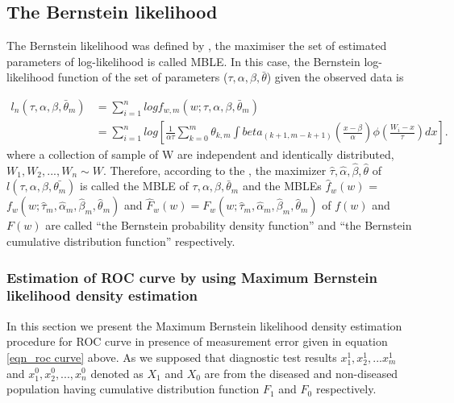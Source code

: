 \subsection{The Bernstein likelihood }


The Bernstein likelihood was defined by \cite{guan2016efficient}, the maximiser the set of estimated parameters of log-likelihood is called MBLE. In this case, the Bernstein log-likelihood function of the set of parameters ($\tau, \alpha, \beta, \bar{\theta}$) given the observed data is

\begin{equation}
\begin{split}
l_n(\tau, \alpha, \beta,\bar{\theta}_m) &=\sum_{i=1}^{n} log  f_{w,m}(w; \tau, \alpha, \beta, \bar \theta_m)\\
&=\sum_{i=1}^{n} log \displaystyle \left[\frac{1}{\alpha\tau} \displaystyle \sum_{k=0}^m \theta_{k,m} \int beta _{(k+1, m-k+1)}\left(\frac{x-\beta}{\alpha}\right)\phi \displaystyle\left(\frac{W_i-x}{\tau}\right) dx \right].
\end{split}
\end{equation}
where  a collection of sample of W are  independent and identically distributed, $W_1, W_2, ..., W_n \sim W $. Therefore, according to the \cite{guan2016efficient}, the maximizer $\hat{\tau},\hat{\alpha}, \hat{\beta}, \hat{\theta}$ of $l(\tau, \alpha, \beta,\bar{\theta_m})$ is called the MBLE of $ \tau,\alpha, \beta,\bar{\theta}_m$ and the MBLEs $\hat{f}_w(w)$ = $f_w(w; \hat{\tau}_m,\hat{\alpha}_m, \hat{\beta}_m, \hat{\theta}_m)$  and $\hat{F}_w(w) = F_w(w; \hat{\tau}_m,\hat{\alpha}_m, \hat{\beta}_m, \hat{\theta}_m )$  of $f(w)$ and $F(w)$ are called \enquote{the Bernstein probability density function} and \enquote{the Bernstein cumulative distribution function} respectively.

\subsubsection{Estimation of ROC curve by using Maximum Bernstein likelihood density estimation }

In this section we present the Maximum Bernstein likelihood density estimation procedure for ROC curve in presence of measurement error given in equation \ref{eqn_roc curve} above. As we supposed that diagnostic test results $x^1_1, x^1_2, ... x^1_m$ and $x^0_1, x^0_2, ..., x^0_n$  denoted as $X_1$ and $X_0$ are from the diseased and non-diseased population having cumulative distribution function $F_1$ and $F_0$ respectively.

